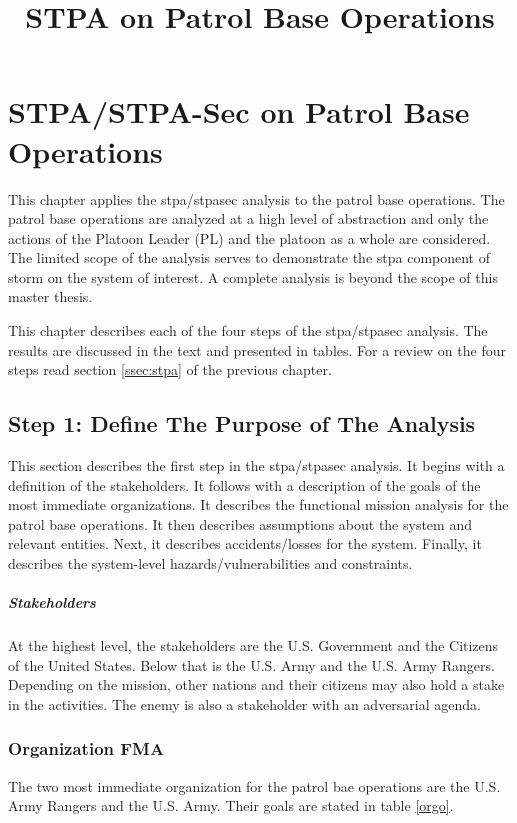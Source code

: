 \documentclass[../../main/main.tex]{subfiles}
\begin{document}
\title{STPA on Patrol Base Operations}

\chapter{STPA/STPA-Sec on Patrol Base Operations}\label{chp:stpapb}
This chapter applies the \gls{stpa}/\gls{stpasec} analysis to the patrol base operations.  The patrol base operations are analyzed at a high level of abstraction and only the actions of the Platoon Leader (PL) and the platoon as a whole are considered.  The limited scope of the analysis serves to demonstrate the \gls{stpa} component of \gls{storm} on the system of interest.  A complete analysis is beyond the scope of this master thesis. 

This chapter describes each of the four steps of the \gls{stpa}/\gls{stpasec} analysis.  The results are discussed in the text and presented in tables.   For a review on the four steps read section \ref{ssec:stpa} of the previous chapter.

\section{Step 1: Define The Purpose of The Analysis}\label{chp:stpapb:purpose}
This section describes the first step in the \gls{stpa}/\gls{stpasec} analysis.  It begins with a definition of the stakeholders.  It follows with a description of the goals of the most immediate organizations.  It describes the functional mission analysis for the patrol base operations.  It then describes assumptions about the system and relevant entities.  Next, it describes accidents/losses for the system.  Finally, it describes the system-level hazards/vulnerabilities and constraints.

\paragraph*{Stakeholders}
At the highest level, the stakeholders are the U.S. Government and the Citizens of the United States.  Below that is the U.S. Army and the U.S. Army Rangers.  Depending on the mission, other nations and their citizens may also hold a stake in the activities.  The enemy is also a stakeholder with an adversarial agenda. 

\subsection{Organization FMA}
The two most immediate organization for the patrol bae operations are the U.S. Army Rangers and the U.S. Army.  Their goals are stated in table \ref{orgo}.
\end{document}
